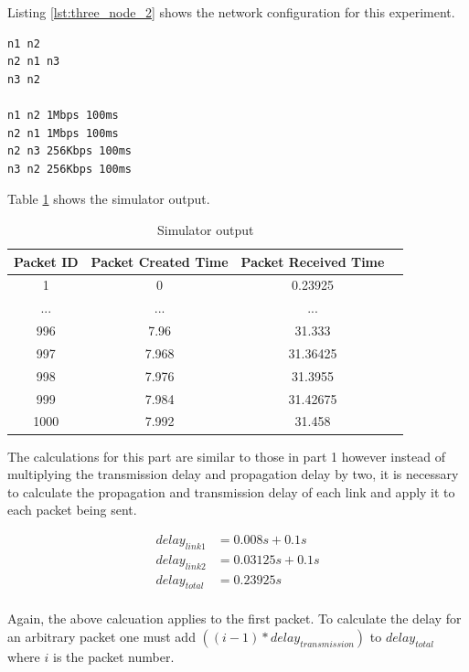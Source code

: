 \documentclass[fleqn,11pt]{article}
\begin{document}
Listing \ref{lst:three_node_2} shows the network configuration for this experiment.

\vspace{0.5cm}
\begin{lstlisting}[caption={Network configuration},label={lst:three_node_2}]
n1 n2
n2 n1 n3
n3 n2

n1 n2 1Mbps 100ms
n2 n1 1Mbps 100ms
n2 n3 256Kbps 100ms
n3 n2 256Kbps 100ms
\end{lstlisting}

\noindent
Table \ref{tab:three_node_2} shows the simulator output.

\begin{table}[h]
  \caption{Simulator output}
  \label{tab:three_node_2}
  \begin{center}
    \begin{tabular}{cccc}
      \toprule
      Packet ID & Packet Created Time & Packet Received Time & \\
      \midrule
      1 & 0 & 0.23925\\
      ... & ... & ...\\
      996 & 7.96 & 31.333\\
      997 & 7.968 & 31.36425\\
      998 & 7.976 & 31.3955\\
      999 & 7.984 & 31.42675\\
      1000 & 7.992 & 31.458\\
      \bottomrule
    \end{tabular}
  \end{center}
\end{table}
\vspace{0.5cm}

\noindent
The calculations for this part are similar to those in part 1 however instead
of multiplying the transmission delay and propagation delay by two, it is
necessary to calculate the propagation and transmission delay of each link and
apply it to each packet being sent.

\begin{align*}
  delay_{link1} &= 0.008s + 0.1s\\
  delay_{link2} &= 0.03125s + 0.1s\\
  delay_{total} &= 0.23925s\\
\end{align*}

\noindent
Again, the above calcuation applies to the first packet. To calculate the delay
for an arbitrary packet one must add $((i - 1) * delay_{transmission})$ to $delay_{total}$ where
$i$ is the packet number.
\end{document}
